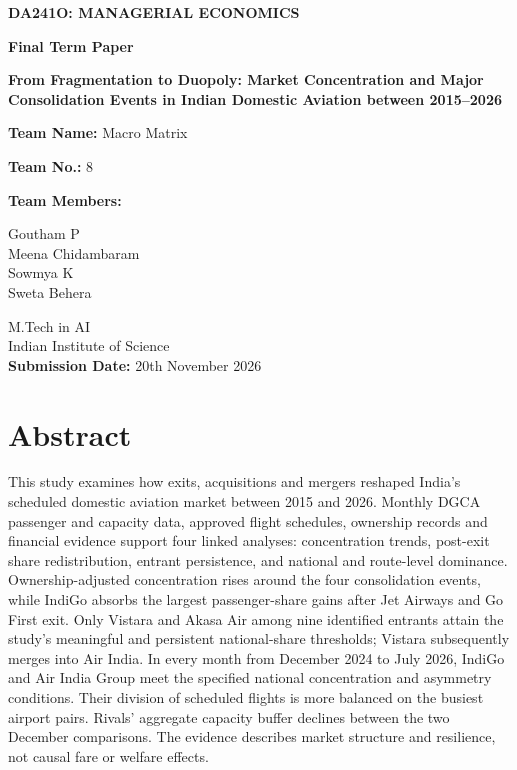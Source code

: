 \documentclass[12pt,a4paper]{article}
\begin{document}
\hypersetup{pageanchor=false}
\begin{titlepage}
\centering
\vspace*{1cm}
{\Large\bfseries DA241O: MANAGERIAL ECONOMICS\par}
\vspace{0.8cm}
{\LARGE\bfseries Final Term Paper\par}
\vspace{1cm}
{\Large\bfseries From Fragmentation to Duopoly: Market Concentration and Major Consolidation Events in Indian Domestic Aviation between 2015--2026\par}
\vspace{1cm}
{\large\textbf{Team Name:} Macro Matrix\par}
{\large\textbf{Team No.:} 8\par}
\vspace{0.75cm}
{\large\textbf{Team Members:}\par}
\vspace{0.3cm}
{\large \textcolor{authorGoutham}{Goutham P}\\
\textcolor{authorMeena}{Meena Chidambaram}\\
\textcolor{authorSowmya}{Sowmya K}\\
\textcolor{authorSweta}{Sweta Behera}\par}
\vfill
{\large M.Tech in AI\\
Indian Institute of Science\\[0.5cm]
\textbf{Submission Date:} 20th November 2026\par}
\end{titlepage}
\hypersetup{pageanchor=true}
\setcounter{page}{1}

\section*{Abstract}
This study examines how exits, acquisitions and mergers reshaped India's scheduled domestic aviation market between 2015 and 2026. Monthly DGCA passenger and capacity data, approved flight schedules, ownership records and financial evidence support four linked analyses: concentration trends, post-exit share redistribution, entrant persistence, and national and route-level dominance. Ownership-adjusted concentration rises around the four consolidation events, while IndiGo absorbs the largest passenger-share gains after Jet Airways and Go First exit. Only Vistara and Akasa Air among nine identified entrants attain the study's meaningful and persistent national-share thresholds; Vistara subsequently merges into Air India. In every month from December 2024 to July 2026, IndiGo and Air India Group meet the specified national concentration and asymmetry conditions. Their division of scheduled flights is more balanced on the busiest airport pairs. Rivals' aggregate capacity buffer declines between the two December comparisons. The evidence describes market structure and resilience, not causal fare or welfare effects.
\end{document}
